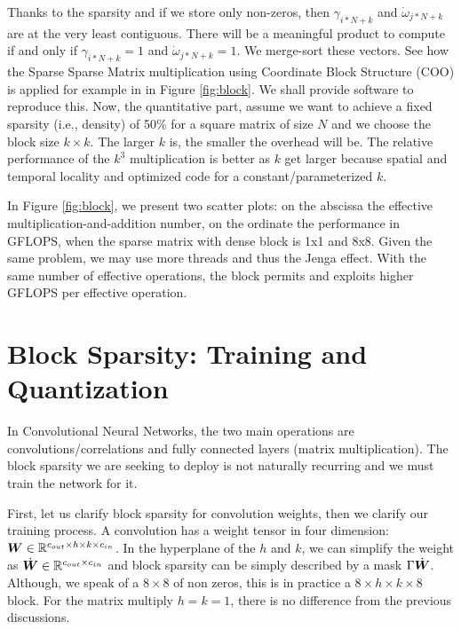 \documentclass[sigconf]{acmart}
\begin{document}
Thanks to the sparsity and if we store only non-zeros, then
$\gamma_{i*N+k}$ and $\dot{\omega}_{j*N+k}$ are at the very least
contiguous. There will be a meaningful product to compute if and only
if $\gamma_{i*N+k} =1$ and  $\dot{\omega}_{j*N+k} =1$.  We merge-sort
these vectors.  See how the Sparse Sparse Matrix multiplication using
Coordinate Block Structure (COO) is applied for example in
in Figure \ref{fig:block}. We shall provide software to reproduce this. %
Now, the quantitative part, assume we want to
achieve a fixed sparsity (i.e., density) of 50\% for a square matrix
of size $N$ and we choose the block size $k \times k$. The larger $k$
is, the smaller the overhead will be.  The relative performance of the
$k^3$ multiplication is better as $k$ get larger because spatial and
temporal locality and optimized code for a constant/parameterized $k$.


In Figure \ref{fig:block}, we present two scatter plots: on the
abscissa the effective multiplication-and-addition number, on the
ordinate the performance in GFLOPS, when the sparse matrix with dense
block is 1x1 and 8x8. Given the same problem, we may use more threads
and thus the Jenga effect.  With the same number of effective
operations, the block permits and exploits higher GFLOPS per effective
operation.



\section{Block Sparsity: Training and Quantization}
\label{sec:training}

In Convolutional Neural Networks, the two main operations are
convolutions/correlations and fully connected layers (matrix
multiplication). The block sparsity we are seeking to deploy is not
naturally recurring and  we must train the network for it.

First, let us clarify block sparsity for convolution weights, then we
clarify our training process. A convolution has a weight tensor in
four dimension: ${\boldsymbol W} \in \mathbb{R}^{c_{out}\times h \times k \times
  c_{in}}$. In the hyperplane of the $h$ and $k$, 
  we can simplify the weight as $\dot{{\boldsymbol W}} \in \mathbb{R}^{c_{out}
  \times c_{in}}$ and block sparsity can be simply described by a mask
$\Gamma\dot{{\boldsymbol W}}$. Although, we speak of a $8\times 8$ of non
zeros, this is in practice a $8\times h\times k\times 8$ block. For
the matrix multiply $h=k=1$, there is no difference from the
previous discussions.
\end{document}
